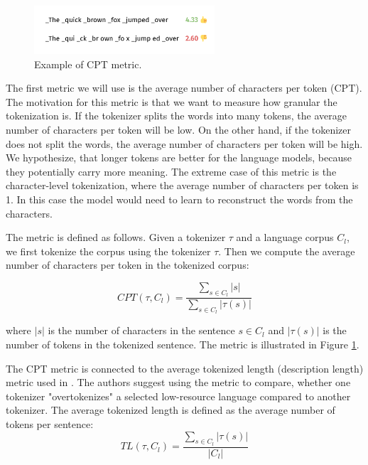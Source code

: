 \begin{figure}[h]
    \centering
    \includegraphics[width=0.6\textwidth]{img/temp/cpt_example.png}
    \caption{Example of CPT metric.}
    \label{fig:cpt_example}
\end{figure}

The first metric we will use is the average number of characters per token (CPT). The motivation for this metric is that we want to measure how granular the tokenization is. If the tokenizer splits the words into many tokens, the average number of characters per token will be low. On the other hand, if the tokenizer does not split the words, the average number of characters per token will be high. We hypothesize, that longer tokens are better for the language models, because they potentially carry more meaning. The extreme case of this metric is the character-level tokenization, where the average number of characters per token is 1. In this case the model would need to learn to reconstruct the words from the characters.

The metric is defined as follows. Given a tokenizer $\tau$ and a language corpus $C_l$, we first tokenize the corpus using the tokenizer $\tau$. Then we compute the average number of characters per token in the tokenized corpus:

\begin{equation}
    CPT(\tau, C_l) = \frac{\sum_{s \in C_l}|s|}{\sum_{s \in C_l}|\tau(s)|}
\end{equation}

where $|s|$ is the number of characters in the sentence $s \in C_l$ and $|\tau(s)|$ is the number of tokens in the tokenized sentence. The metric is illustrated in Figure \ref{fig:cpt_example}.

The CPT metric is connected to the average tokenized length (description length) metric used in \citet{chung_improving_2020,liang_xlm-v_2023}. The authors suggest using the metric to compare, whether one tokenizer "overtokenizes" a selected low-resource language compared to another tokenizer. The average tokenized length is defined as the average number of tokens per sentence: 
\begin{equation}
    TL(\tau, C_l) = \frac{\sum_{s \in C_l}|\tau(s)|}{|C_l|}
\end{equation}

